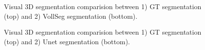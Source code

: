 \documentclass[letterpaper,compsoc,twoside]{IEEEtran}
\begin{document}
\begin{figure}[]
\caption{Visual 3D segmentation comparision between 1) GT segmentation (top) and 2) VollSeg segmentation (bottom).}
\end{figure}\begin{figure}[]
\label{fig-gtunet}\noindent{}
\caption{Visual  3D segmentation comparision between 1) GT segmentation (top) and 2) Unet segmentation (bottom).}
\end{figure}\begin{figure}[]

\end{figure}
\end{document}
